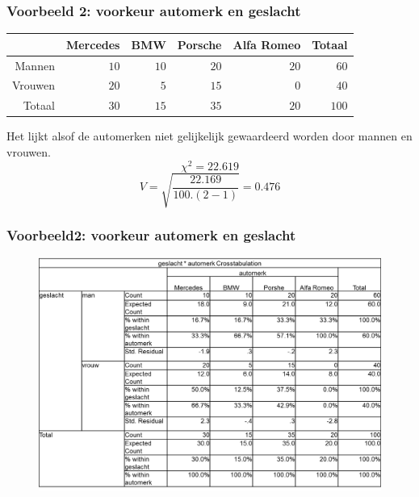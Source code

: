 \documentclass{beamer}
\begin{document}
    \begin{frame}
      \frametitle{Voorbeeld 2: voorkeur automerk en geslacht}
      \begin{table}[h] \centering
        \begin{tabular}{@{}rrrrrr@{}} \toprule
          & Mercedes & BMW & Porsche& Alfa Romeo & Totaal \\
          \midrule
          Mannen  & $10$ & $10$ & $20$ & $20$ & $60$ \\
          Vrouwen & $20$ & $5$  & $15$ & $0$  & $40$ \\
          Totaal  & $30$ & $15$ & $35$ & $20$ & $100$ \\
          \bottomrule
        \end{tabular}
      \end{table}
      Het lijkt alsof de automerken niet gelijkelijk gewaardeerd worden door mannen en vrouwen.
      \[ \chi^{2} = 22.619 \]
      \[ V = \sqrt{\frac{22.169}{100 . (2-1)}}  = 0.476\]
    \end{frame}

    \begin{frame}
      \frametitle{Voorbeeld2: voorkeur automerk en geslacht}

      \begin{figure}
        \centering
        \includegraphics[width=1.00\textwidth]{img/les3-spssCars.png}
        \label{fig:les3-spssCars}
      \end{figure}

    \end{frame}
\end{document}
